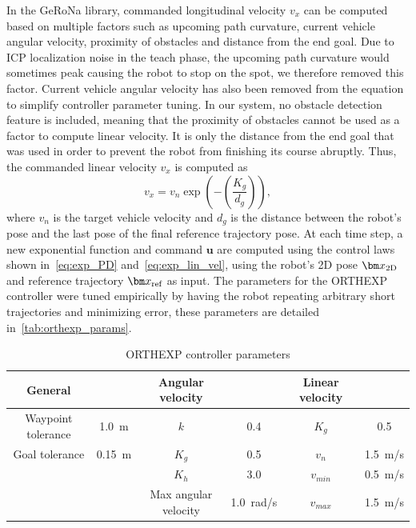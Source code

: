 In the \ac{GeRoNa} library, commanded longitudinal velocity $v_x$ can be computed based on multiple factors such as upcoming path curvature, current vehicle angular velocity, proximity of obstacles and distance from the end goal.
Due to \ac{ICP} localization noise in the teach phase, the upcoming path curvature would sometimes peak causing the robot to stop on the spot, we therefore removed this factor.
Current vehicle angular velocity has also been removed from the equation to simplify controller parameter tuning.
In our system, no obstacle detection feature is included, meaning that the proximity of obstacles cannot be used as a factor to compute linear velocity.
It is only the distance from the end goal that was used in order to prevent the robot from finishing its course abruptly.
Thus, the commanded linear velocity $v_x$ is computed as
\begin{equation}
	\label{eq:exp_lin_vel}
	v_x = v_n \exp\left(-\left(\frac{K_g}{d_g}\right)\right),
\end{equation}
where $v_n$ is the target vehicle velocity and $d_g$ is the distance between the robot's pose and the last pose of the final reference trajectory pose.
At each time step, a new exponential function and command $\bm u$ are computed using the control laws shown in~\autoref{eq:exp_PD} and~\autoref{eq:exp_lin_vel}, using the robot's 2D pose $\poseplane$ and reference trajectory $\reftraj$ as input.
The parameters for the \ac{ORTHEXP} controller were tuned empirically by having the robot repeating arbitrary short trajectories and minimizing error, these parameters are detailed in~\autoref{tab:orthexp_params}.


\begin{table}[htpb]
	\caption{\ac{ORTHEXP} controller parameters} \label{tab:orthexp_params}
	\begin{center}
		\begin{tabular}{c c c c c c} \toprule
			General            &              & Angular velocity     &                 & Linear velocity                 \\
			\midrule
			Waypoint tolerance & \SI{1.0}{m}  & $k$                  & 0.4             & $K_g$           & 0.5           \\
			Goal tolerance     & \SI{0.15}{m} & $K_g$                & 0.5             & $v_n$           & \SI{1.5}{m/s} \\
			                   &              & $K_h$                & 3.0             & $v_{min}$       & \SI{0.5}{m/s} \\
			                   &              & Max angular velocity & \SI{1.0}{rad/s} & $v_{max}$       & \SI{1.5}{m/s} \\
			\bottomrule
		\end{tabular}
	\end{center}
\end{table}


